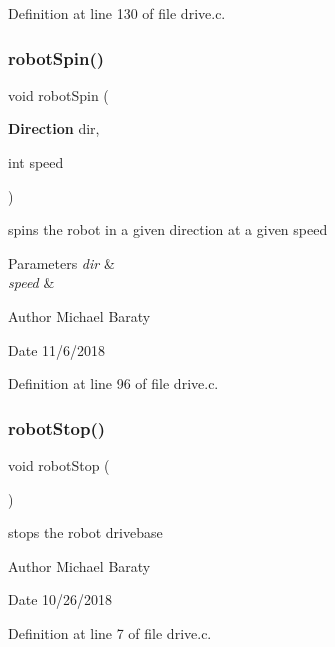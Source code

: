 Definition at line 130 of file drive.\+c.

\mbox{\label{drive_8c_ab8d8bae0e22ee3c8d2f3150295e5faba}} 
\subsubsection{robot\+Spin()}
{\footnotesize\ttfamily void robot\+Spin (\begin{DoxyParamCaption}\item[{\textbf{ Direction}}]{dir,  }\item[{int}]{speed }\end{DoxyParamCaption})}



spins the robot in a given direction at a given speed 


\begin{DoxyParams}{Parameters}
{\em dir} & \\
\hline
{\em speed} & \\
\hline
\end{DoxyParams}
\begin{DoxyAuthor}{Author}
Michael Baraty 
\end{DoxyAuthor}
\begin{DoxyDate}{Date}
11/6/2018 
\end{DoxyDate}


Definition at line 96 of file drive.\+c.

\mbox{\label{drive_8c_a69f6d219d1eedd14cd191b0b201796df}} 
\subsubsection{robot\+Stop()}
{\footnotesize\ttfamily void robot\+Stop (\begin{DoxyParamCaption}{ }\end{DoxyParamCaption})}



stops the robot drivebase 

\begin{DoxyAuthor}{Author}
Michael Baraty 
\end{DoxyAuthor}
\begin{DoxyDate}{Date}
10/26/2018 
\end{DoxyDate}


Definition at line 7 of file drive.\+c.

